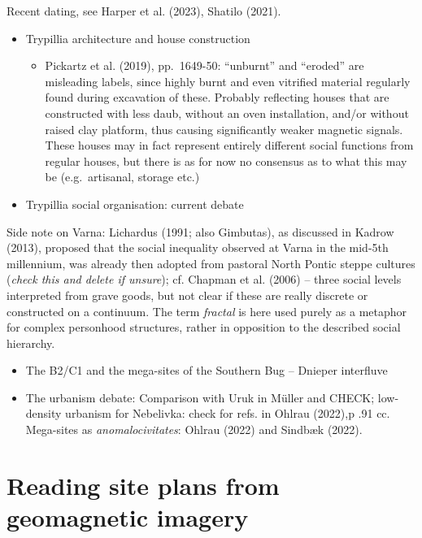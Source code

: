 \documentclass[
  12pt,
]{book}
\providecommand{\tightlist}{%
  \setlength{\itemsep}{0pt}\setlength{\parskip}{0pt}}
\begin{document}
Recent dating, see Harper et al. (2023), Shatilo (2021).

\begin{itemize}
\item
  Trypillia architecture and house construction

  \begin{itemize}
  \tightlist
  \item
    Pickartz et al. (2019), pp.~1649-50: ``unburnt'' and ``eroded'' are misleading labels, since highly burnt and even vitrified material regularly found during excavation of these. Probably reflecting houses that are constructed with less daub, without an oven installation, and/or without raised clay platform, thus causing significantly weaker magnetic signals. These houses may in fact represent entirely different social functions from regular houses, but there is as for now no consensus as to what this may be (e.g.~artisanal, storage etc.)
  \end{itemize}
\item
  Trypillia social organisation: current debate
\end{itemize}

Side note on Varna: Lichardus (1991; also Gimbutas), as discussed in Kadrow (2013), proposed that the social inequality observed at Varna in the mid-5th millennium, was already then adopted from pastoral North Pontic steppe cultures (\emph{check this and delete if unsure}); cf. Chapman et al. (2006) -- three social levels interpreted from grave goods, but not clear if these are really discrete or constructed on a continuum. The term \emph{fractal} is here used purely as a metaphor for complex personhood structures, rather in opposition to the described social hierarchy.

\begin{itemize}
\tightlist
\item
  The B2/C1 and the mega-sites of the Southern Bug -- Dnieper interfluve
\item
  The urbanism debate: Comparison with Uruk in Müller and CHECK; low-density urbanism for Nebelivka: check for refs. in Ohlrau (2022),p .91 cc. Mega-sites as \emph{anomalocivitates}: Ohlrau (2022) and Sindbæk (2022).
\end{itemize}

\hypertarget{reading-site-plans-from-geomagnetic-imagery}{%
\section{Reading site plans from geomagnetic imagery}\label{reading-site-plans-from-geomagnetic-imagery}}
\end{document}
